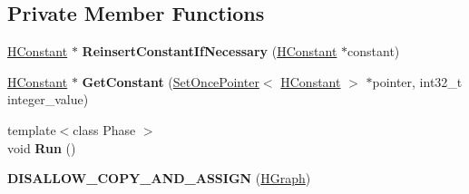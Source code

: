 \subsection*{Private Member Functions}
\begin{DoxyCompactItemize}
\item 
\hyperlink{classv8_1_1internal_1_1_h_constant}{H\+Constant} $\ast$ {\bfseries Reinsert\+Constant\+If\+Necessary} (\hyperlink{classv8_1_1internal_1_1_h_constant}{H\+Constant} $\ast$constant)\hypertarget{classv8_1_1internal_1_1_h_graph_a1d7d4007eba84e48558da935ddcf67c8}{}\label{classv8_1_1internal_1_1_h_graph_a1d7d4007eba84e48558da935ddcf67c8}

\item 
\hyperlink{classv8_1_1internal_1_1_h_constant}{H\+Constant} $\ast$ {\bfseries Get\+Constant} (\hyperlink{classv8_1_1internal_1_1_set_once_pointer}{Set\+Once\+Pointer}$<$ \hyperlink{classv8_1_1internal_1_1_h_constant}{H\+Constant} $>$ $\ast$pointer, int32\+\_\+t integer\+\_\+value)\hypertarget{classv8_1_1internal_1_1_h_graph_a3a2d55e10492f50f28d854a5cb06e004}{}\label{classv8_1_1internal_1_1_h_graph_a3a2d55e10492f50f28d854a5cb06e004}

\item 
{\footnotesize template$<$class Phase $>$ }\\void {\bfseries Run} ()\hypertarget{classv8_1_1internal_1_1_h_graph_a2c3ab4a3802562ae606332bc3b7fd1b3}{}\label{classv8_1_1internal_1_1_h_graph_a2c3ab4a3802562ae606332bc3b7fd1b3}

\item 
{\bfseries D\+I\+S\+A\+L\+L\+O\+W\+\_\+\+C\+O\+P\+Y\+\_\+\+A\+N\+D\+\_\+\+A\+S\+S\+I\+GN} (\hyperlink{classv8_1_1internal_1_1_h_graph}{H\+Graph})\hypertarget{classv8_1_1internal_1_1_h_graph_a42aaf723a3632ca1fb3e3b51801a825e}{}\label{classv8_1_1internal_1_1_h_graph_a42aaf723a3632ca1fb3e3b51801a825e}

\end{DoxyCompactItemize}
